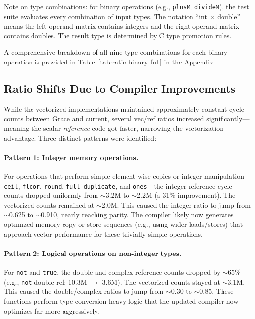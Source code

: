 Note on type combinations: for binary operations (e.g., \texttt{plusM}, \texttt{divideM}), the test suite evaluates every combination of input types. The notation ``int $\times$ double'' means the left operand matrix contains integers and the right operand matrix contains doubles. The result type is determined by C type promotion rules.





A comprehensive breakdown of all nine type combinations for each binary operation is provided in Table~\ref{tab:ratio-binary-full} in the Appendix.

\subsection{Ratio Shifts Due to Compiler Improvements}

While the vectorized implementations maintained approximately constant cycle counts between Grace and current, several vec/ref ratios increased significantly---meaning the scalar \emph{reference} code got faster, narrowing the vectorization advantage. Three distinct patterns were identified:

\paragraph{Pattern 1: Integer memory operations.} For operations that perform simple element-wise copies or integer manipulation---\texttt{ceil}, \texttt{floor}, \texttt{round}, \texttt{full\_duplicate}, and \texttt{ones}---the integer reference cycle counts dropped uniformly from $\sim$3.2M to $\sim$2.2M (a 31\% improvement). The vectorized counts remained at $\sim$2.0M. This caused the integer ratio to jump from $\sim$0.625 to $\sim$0.910, nearly reaching parity. The compiler likely now generates optimized memory copy or store sequences (e.g., using wider loads/stores) that approach vector performance for these trivially simple operations.

\paragraph{Pattern 2: Logical operations on non-integer types.} For \texttt{not} and \texttt{true}, the double and complex reference counts dropped by $\sim$65\% (e.g., \texttt{not} double ref: 10.3M $\rightarrow$ 3.6M). The vectorized counts stayed at $\sim$3.1M. This caused the double/complex ratios to jump from $\sim$0.30 to $\sim$0.85. These functions perform type-conversion-heavy logic that the updated compiler now optimizes far more aggressively.

